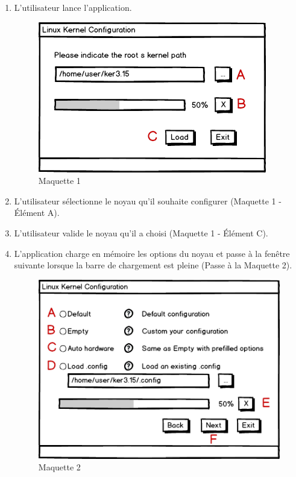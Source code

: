\documentclass[17pts]{report}
\begin{document}
\begin{enumerate}
    \item L'utilisateur lance l'application.
    \begin{figure}[H]
        \includegraphics[scale=0.5]{illustrations/maquettes/Maquette_1_first_dialog.png}
        \centering
        \caption{Maquette 1}
        \label{fig:Maq1}
    \end{figure}
    \item L'utilisateur sélectionne le noyau qu'il souhaite configurer
            (Maquette 1 - Élément A).
    \item L'utilisateur valide le noyau qu'il a choisi (Maquette 1 - Élément C).
    \item L'application charge en mémoire les options du noyau et passe à la
            fenêtre suivante lorsque la barre de chargement est pleine (Passe à
            la Maquette 2).
    \begin{figure}[H]
        \includegraphics[scale=0.5]{illustrations/maquettes/Maquette_2_choose_dialog.png}
        \centering
        \caption{Maquette 2}
        \label{fig:Maq2}
    \end{figure}

\end{enumerate}
\end{document}
